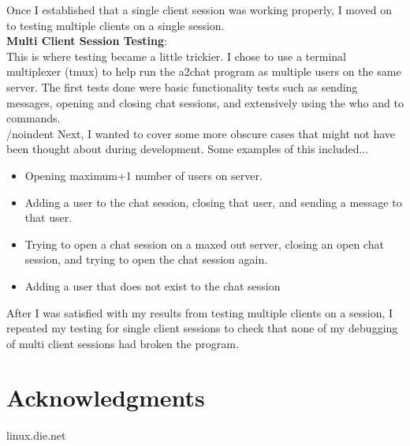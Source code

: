\documentclass{article}
\begin{document}
\noindent
Once I established that a single client session was
working properly, I moved on to testing multiple clients
on a single session. \\

\noindent
\textbf{Multi Client Session Testing}: \\
This is where testing became a little trickier.
I chose to use a terminal multiplexer (tmux) to help
run the a2chat program as multiple users on the same
server. The first tests done were basic functionality
tests such as sending messages, opening and closing
chat sessions, and extensively using the who and
to commands.\\

/noindent
Next, I wanted to cover some more obscure cases
that might not have been thought about during
development. Some examples of this included... \\

\begin{itemize}
  \item Opening maximum+1 number of users on server.
  \item  Adding a user to the chat session, closing that
    user, and sending a message to that user.
  \item Trying to open a chat session on a maxed out
    server, closing an open chat session, and trying
    to open the chat session again.
  \item Adding a user that does not exist to the chat
    session
\end{itemize}

\noindent
After I was satisfied with my results from testing
multiple clients on a session, I repeated my testing
for single client sessions to check that none of my
debugging of multi client sessions had broken the
program. \\

\section{Acknowledgments}
linux.die.net
\end{document}
